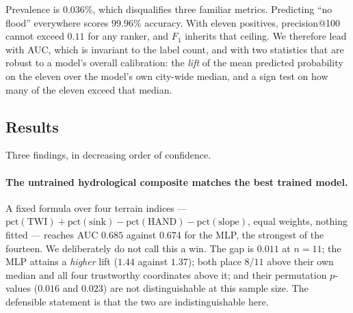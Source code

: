 \documentclass[11pt]{article}
\begin{document}
Prevalence is $0.036\%$, which disqualifies three familiar metrics. Predicting
``no flood'' everywhere scores $99.96\%$ accuracy. With eleven positives,
precision@100 cannot exceed $0.11$ for any ranker, and $F_1$ inherits that
ceiling. We therefore lead with AUC, which is invariant to the label count, and
with two statistics that are robust to a model's overall calibration: the
\emph{lift} of the mean predicted probability on the eleven over the model's own
city-wide median, and a sign test on how many of the eleven exceed that median.

\subsection{Results}

\begin{table}[t]
\centering
\small

\caption{Inference on eleven confirmed flood locations in Al~Madinah. Lift is
the mean predicted probability on the eleven divided by the model's own
city-wide median. ``Above median'' counts how many of the eleven exceed that
median (chance is 5.5/11); ``Trustworthy'' is the same restricted to the four
\emph{exact} and \emph{precise} coordinates. Random AUC is $0.500$ and random AP
is $0.00036$.}
\label{tab:target}
\end{table}

Three findings, in decreasing order of confidence.

\paragraph{The untrained hydrological composite matches the best trained model.}
A fixed formula over four terrain indices ---
$\mathrm{pct}(\mathrm{TWI}) + \mathrm{pct}(\mathrm{sink})
- \mathrm{pct}(\mathrm{HAND}) - \mathrm{pct}(\mathrm{slope})$, equal weights,
nothing fitted --- reaches AUC $0.685$ against $0.674$ for the MLP, the strongest
of the fourteen. We deliberately do not call this a win. The gap is $0.011$ at
$n{=}11$; the MLP attains a \emph{higher} lift ($1.44$ against $1.37$); both place
$8/11$ above their own median and all four trustworthy coordinates above it; and
their permutation $p$-values ($0.016$ and $0.023$) are not distinguishable at this
sample size. The defensible statement is that the two are indistinguishable here.
\end{document}

